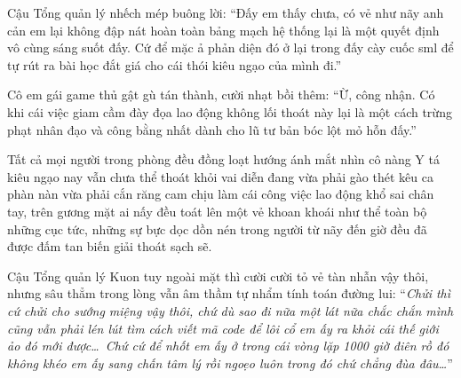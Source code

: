 \documentclass[../main.tex]{subfiles}
\begin{document}
Cậu Tổng quản lý nhếch mép buông lời: ``Đấy em thấy chưa, có vẻ như nãy anh cản em lại không đập nát hoàn toàn bảng mạch hệ thống lại là một quyết định vô cùng sáng suốt đấy. Cứ để mặc ả phản diện đó ở lại trong đấy cày cuốc sml để tự rút ra bài học đắt giá cho cái thói kiêu ngạo của mình đi.''

Cô em gái game thủ gật gù tán thành, cười nhạt bồi thêm: ``Ừ, công nhận. Có khi cái việc giam cầm đày đọa lao động không lối thoát này lại là một cách trừng phạt nhân đạo và công bằng nhất dành cho lũ tư bản bóc lột mỏ hỗn đấy.''

Tất cả mọi người trong phòng đều đồng loạt hướng ánh mắt nhìn cô nàng Y tá kiêu ngạo nay vẫn chưa thể thoát khỏi vai diễn đang vừa phải gào thét kêu ca phàn nàn vừa phải cắn răng cam chịu làm cái công việc lao động khổ sai chân tay, trên gương mặt ai nấy đều toát lên một vẻ khoan khoái như thể toàn bộ những cục tức, những sự bực dọc dồn nén trong người từ nãy đến giờ đều đã được đấm tan biến giải thoát sạch sẽ.

Cậu Tổng quản lý Kuon tuy ngoài mặt thì cười cười tỏ vẻ tàn nhẫn vậy thôi, nhưng sâu thẳm trong lòng vẫn âm thầm tự nhẩm tính toán đường lui: ``\textit{Chửi thì cứ chửi cho sướng miệng vậy thôi, chứ dù sao đi nữa một lát nữa chắc chắn mình cũng vẫn phải lén lút tìm cách viết mã code để lôi cổ em ấy ra khỏi cái thế giới ảo đó mới được\dots\ Chứ cứ để nhốt em ấy ở trong cái vòng lặp 1000 giờ điên rồ đó không khéo em ấy sang chấn tâm lý rồi ngoẹo luôn trong đó chứ chẳng đùa đâu\dots}''
\end{document}
